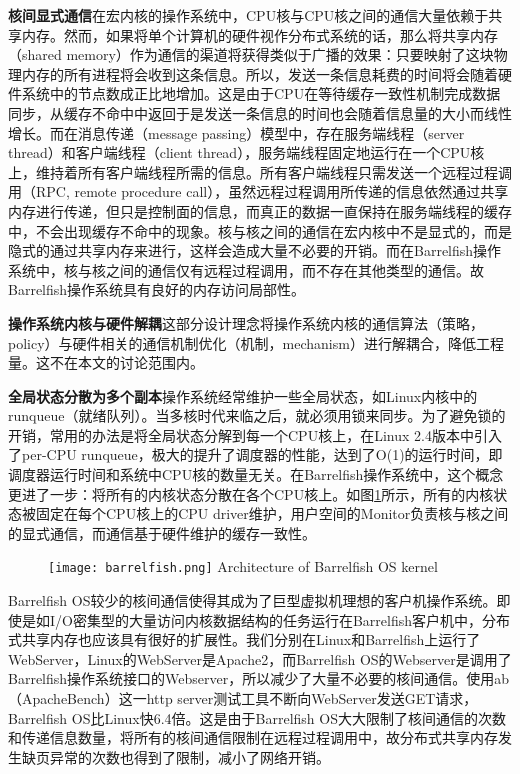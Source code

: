 \noindent\textbf{核间显式通信}\quad 在宏内核的操作系统中，CPU核与CPU核之间的通信大量依赖于共享内存。然而，如果将单个计算机的硬件视作分布式系统的话，那么将共享内存（shared memory）作为通信的渠道将获得类似于广播的效果：只要映射了这块物理内存的所有进程将会收到这条信息。所以，发送一条信息耗费的时间将会随着硬件系统中的节点数成正比地增加。这是由于CPU在等待缓存一致性机制完成数据同步，从缓存不命中中返回于是发送一条信息的时间也会随着信息量的大小而线性增长。而在消息传递（message passing）模型中，存在服务端线程（server thread）和客户端线程（client thread），服务端线程固定地运行在一个CPU核上，维持着所有客户端线程所需的信息。所有客户端线程只需发送一个远程过程调用（RPC, remote procedure call），虽然远程过程调用所传递的信息依然通过共享内存进行传递，但只是控制面的信息，而真正的数据一直保持在服务端线程的缓存中，不会出现缓存不命中的现象。核与核之间的通信在宏内核中不是显式的，而是隐式的通过共享内存来进行，这样会造成大量不必要的开销。而在Barrelfish操作系统中，核与核之间的通信仅有远程过程调用，而不存在其他类型的通信。故Barrelfish操作系统具有良好的内存访问局部性。

\noindent\textbf{操作系统内核与硬件解耦}\quad 这部分设计理念将操作系统内核的通信算法（策略，policy）与硬件相关的通信机制优化（机制，mechanism）进行解耦合，降低工程量。这不在本文的讨论范围内。

\noindent\textbf{全局状态分散为多个副本}\quad 操作系统经常维护一些全局状态，如Linux内核中的runqueue（就绪队列）。当多核时代来临之后，就必须用锁来同步。为了避免锁的开销，常用的办法是将全局状态分解到每一个CPU核上，在Linux 2.4版本\cite{linux}中引入了per-CPU runqueue，极大的提升了调度器的性能，达到了O(1)的运行时间，即调度器运行时间和系统中CPU核的数量无关。在Barrelfish操作系统中，这个概念更进了一步：将所有的内核状态分散在各个CPU核上。如图\ref{fig:barrelfish}所示，所有的内核状态被固定在每个CPU核上的CPU driver维护，用户空间的Monitor负责核与核之间的显式通信，而通信基于硬件维护的缓存一致性。

\begin{figure}[!htp]
  \centering
  \texttt{[image: barrelfish.png]}
    {Architecture of Barrelfish OS kernel}
  \label{fig:barrelfish}
\end{figure}
Barrelfish OS较少的核间通信使得其成为了巨型虚拟机理想的客户机操作系统。即使是如I/O密集型的大量访问内核数据结构的任务运行在Barrelfish客户机中，分布式共享内存也应该具有很好的扩展性。我们分别在Linux和Barrelfish上运行了WebServer，Linux的WebServer是Apache2，而Barrelfish OS的Webserver是调用了Barrelfish操作系统接口的Webserver，所以减少了大量不必要的核间通信。使用ab（ApacheBench）\cite{ab}这一http server测试工具不断向WebServer发送GET请求，Barrelfish OS比Linux快6.4倍\cite{giantvm}。这是由于Barrelfish OS大大限制了核间通信的次数和传递信息数量，将所有的核间通信限制在远程过程调用中，故分布式共享内存发生缺页异常的次数也得到了限制，减小了网络开销。
